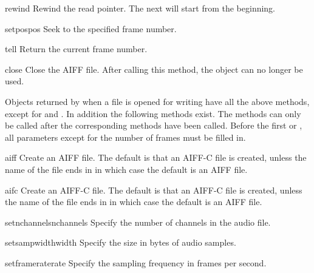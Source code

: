 \begin{methoddesc}[aifc]{rewind}{}
Rewind the read pointer.  The next  will start from
the beginning.
\end{methoddesc}

\begin{methoddesc}[aifc]{setpos}{pos}
Seek to the specified frame number.
\end{methoddesc}

\begin{methoddesc}[aifc]{tell}{}
Return the current frame number.
\end{methoddesc}

\begin{methoddesc}[aifc]{close}{}
Close the AIFF file.  After calling this method, the object can no
longer be used.
\end{methoddesc}

Objects returned by  when a file is opened for
writing have all the above methods, except for  and
.  In addition the following methods exist.  The
 methods can only be called after the corresponding
 methods have been called.  Before the first
 or , all parameters
except for the number of frames must be filled in.

\begin{methoddesc}[aifc]{aiff}{}
Create an AIFF file.  The default is that an AIFF-C file is created,
unless the name of the file ends in  in which case the
default is an AIFF file.
\end{methoddesc}

\begin{methoddesc}[aifc]{aifc}{}
Create an AIFF-C file.  The default is that an AIFF-C file is created,
unless the name of the file ends in  in which case the
default is an AIFF file.
\end{methoddesc}

\begin{methoddesc}[aifc]{setnchannels}{nchannels}
Specify the number of channels in the audio file.
\end{methoddesc}

\begin{methoddesc}[aifc]{setsampwidth}{width}
Specify the size in bytes of audio samples.
\end{methoddesc}

\begin{methoddesc}[aifc]{setframerate}{rate}
Specify the sampling frequency in frames per second.
\end{methoddesc}

